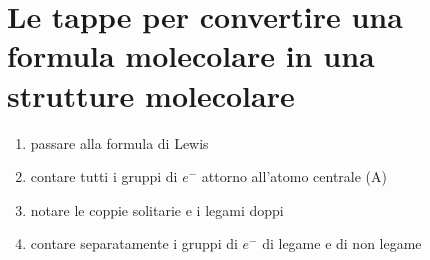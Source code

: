 \documentclass[a4paper,11pt]{report}
\begin{document}
\section{Le tappe per convertire una formula molecolare in una strutture molecolare}

\begin{enumerate}
	\item passare alla formula di Lewis
	\item contare tutti i gruppi di $e^-$ attorno all'atomo centrale (A)
	\item notare le coppie solitarie e i legami doppi
	\item contare separatamente i gruppi di $e^-$ di legame e di non legame
\end{enumerate}
\end{document}
